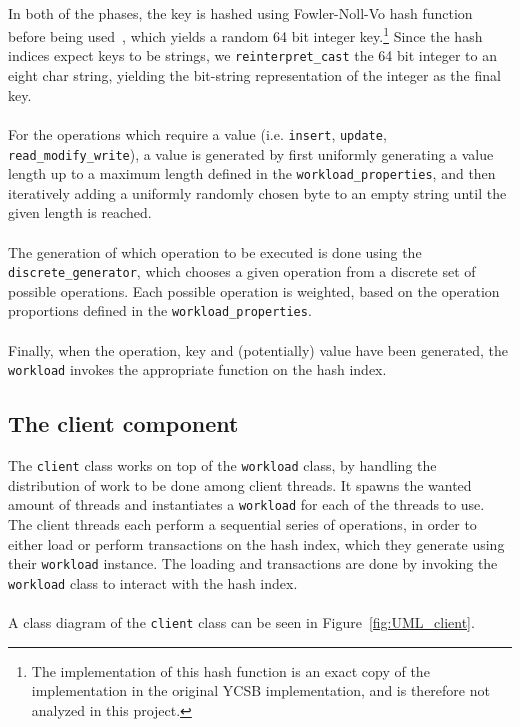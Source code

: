 \documentclass[11pt]{report} %
\begin{document}
\\
In both of the phases, the key is hashed using Fowler-Noll-Vo hash function before being used~\cite{FNV}, which yields a random 64 bit integer key.\footnote{The implementation of this hash function is an exact copy of the implementation in the original YCSB implementation, and is therefore not analyzed in this project.} Since the hash indices expect keys to be strings, we \verb|reinterpret_cast| the 64 bit integer to an eight char string, yielding the bit-string representation of the integer as the final key.\\
\\
For the operations which require a value (i.e. \verb|insert|, \verb|update|, \verb|read_modify_write|), a value is generated by first uniformly generating a value length up to a maximum length defined in the \verb|workload_properties|, and then iteratively adding a uniformly randomly chosen byte to an empty string until the given length is reached.\\
\\
The generation of which operation to be executed is done using the \verb|discrete_generator|, which chooses a given operation from a discrete set of possible operations. Each possible operation is weighted, based on the operation proportions defined in the \verb|workload_properties|.\\
\\
Finally, when the operation, key and (potentially) value have been generated, the \verb|workload| invokes the appropriate function on the hash index.

\subsection{The client component}
The \verb|client| class works on top of the \verb|workload| class, by handling the distribution of work to be done among client threads. It spawns the wanted amount of threads and instantiates a \verb|workload| for each of the threads to use. The client threads each perform a sequential series of operations, in order to either load or perform transactions on the hash index, which they generate using their \verb|workload| instance. The loading and transactions are done by invoking the \verb|workload| class to interact with the hash index. \\
\\
A class diagram of the \verb|client| class can be seen in Figure~\ref{fig:UML_client}. \\
\end{document}
